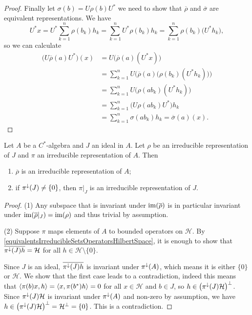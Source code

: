\begin{proof}
Finally let $\sigma(b) = U\rho(b)U^*$ we need to show that $\overline{\rho}$ and $\overline{\sigma}$ are equivalent representations. We have
\[ U^*x = U^*\sum_{k=1}^n\rho(b_k)h_k = \sum_{k=1}^nU^*\rho(b_k)h_k = \sum_{k=1}^n\rho(b_k)\big(U^*h_k\big), \]
so we can calculate
\begin{align*}
\big(U\overline{\rho}(a)U^*\big)(x) &= U\big(\overline{\rho}(a)(U^*x)\big) \\
&= \sum_{k=1}^nU\Big(\overline{\rho}(a)\big(\rho(b_k)(U^*h_k)\big)\Big) \\
&= \sum_{k=1}^nU\big(\rho(ab_k)(U^*h_k)\big) \\
&= \sum_{k=1}^n\big(U\rho(ab_k)U^*\big)h_k \\
&= \sum_{k=1}^n\sigma(ab_k)h_k = \overline{\sigma}(a)(x).
\end{align*}
\end{proof}

\begin{proposition}
Let $A$ be a $C^*$-algebra and $J$ an ideal in $A$. Let $\rho$ be an irreducible representation of $J$ and $\pi$ an irreducible representation of $A$.
Then
\begin{enumerate}
\item $\overline{\rho}$ is an irreducible representation of $A$;
\item if $\pi^\downarrow(J)\neq \{0\}$, then $\pi|_J$ is an irreducible representation of $J$.
\end{enumerate}
\end{proposition}
\begin{proof}
(1) Any subspace that is invariant under $\operatorname{im}(\overline{\rho})$ is in particular invariant under $\operatorname{im}(\overline{\rho}|_J) = \operatorname{im}(\rho)$ and thus trivial by assumption.

(2) Suppose $\pi$ maps elements of $A$ to bounded operators on $\mathcal{H}$. By \ref{equivalentsIrreducibleSetsOperatorsHilbertSpace}, it is enough to show that $\overline{\pi^{\downarrow}(J)h} = \mathcal{H}$ for all $h\in \mathcal{H}\setminus\{0\}$.

Since $J$ is an ideal, $\overline{\pi^{\downarrow}(J)h}$ is invariant under $\pi^\downarrow(A)$, which means it is either $\{0\}$ or $\mathcal{H}$. We show that the first case leads to a contradiction, indeed this means that $\left\langle \pi(b)x, h \right\rangle = \left\langle x, \pi(b^*)h \right\rangle = 0$ for all $x\in \mathcal{H}$ and $b\in J$, so $h\in \big(\pi^\downarrow(J)\mathcal{H}\big)^\perp$. Since $\pi^\downarrow(J)\mathcal{H}$ is invariant under $\pi^\downarrow(A)$ and non-zero by assumption, we have $h\in \big(\pi^\downarrow(J)\mathcal{H}\big)^\perp = \mathcal{H}^\perp = \{0\}$. This is a contradiction.
\end{proof}

